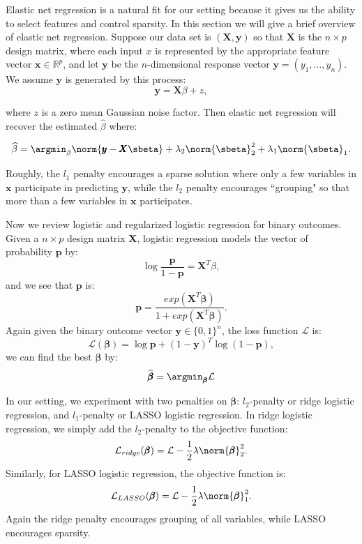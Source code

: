 Elastic net regression is a natural fit for our setting because it gives us the ability to select features and control sparsity. In this section we will give a brief overview of elastic net regression. Suppose our data set is $(\pmb{X}, \pmb{y})$ so that $\pmb{X}$ is the $n \times p$ design matrix, where each input $x$ is represented by the appropriate feature vector $\pmb{x} \in \mathbb{R}^p$, and let $\pmb{y}$ be the $n$-dimensional response vector $\pmb{y} = (y_1, \ldots, y_n)$. We assume $\pmb{y}$ is generated by this process:
	\[
		\pmb{y} = \pmb{X} \mathcal{\beta} + z,
	\]

where $z$ is a zero mean Gaussian noise factor. Then elastic net regression will recover the estimated $\widehat{\mathcal{\beta}}$ where:

	\[
		\widehat{\mathcal{\beta}} = \argmin_{\beta} \norm{\pmb{y} - \pmb{X} \sbeta} + \lambda_2 \norm{\sbeta}_2^2 + \lambda_1 \norm{\sbeta}_1.
	\]

Roughly, the $l_1$ penalty encourages a sparse solution where only a few variables in $\pmb{x}$ participate in predicting $\pmb{y}$, while the $l_2$ penalty encourages ``grouping" so that more than a few variables in $\pmb{x}$ participates. 

Now we review logistic and regularized logistic regression for binary outcomes. Given a $n \times p$ design matrix $\pmb{X}$, logistic regression models the vector of probability $\pmb{p}$ by:
	\[
		\log \frac{\pmb{p}}{1 - \pmb{p}} = \pmb{X}^T \mathcal{\beta},
	\]
and we see that $\pmb{p}$ is:
	\[
		\pmb{p} = \frac{exp(\pmb{X}^T \pmb{\beta})}{1 + exp(\pmb{X}^T \pmb{\beta})}.
	\]
Again given the binary outcome vector $\pmb{y} \in \{0,1\}^n$, the loss function $\mathcal{L}$ is:
	\[
		\mathcal{L}(\pmb{\beta}) = \log \pmb{p} + (1-\pmb{y})^T \log(1 - \pmb{p}),
	\]
we can find the best $\pmb{\beta}$ by:
	\[	
		\widehat{\pmb{\beta}} = \argmin_{\pmb{\beta}} \mathcal{L}
	\]

In our setting, we experiment with two penalties on $\pmb{\beta}$: $l_2$-penalty or ridge logistic regression, and $l_1$-penalty or LASSO logistic regression. In ridge logistic regression, we simply add the $l_2$-penalty to the objective function:
	\[	
		\mathcal{L}_{ridge}(\pmb{\beta}) = \mathcal{L} - \frac{1}{2} \lambda \norm{\pmb{\beta}}_2^2.
	\]
Similarly, for LASSO logistic regression, the objective function is:
	\[	
		\mathcal{L}_{LASSO}(\pmb{\beta}) = \mathcal{L} - \frac{1}{2} \lambda \norm{\pmb{\beta}}_1^2.
	\]
Again the ridge penalty encourages grouping of all variables, while LASSO encourages sparsity.

